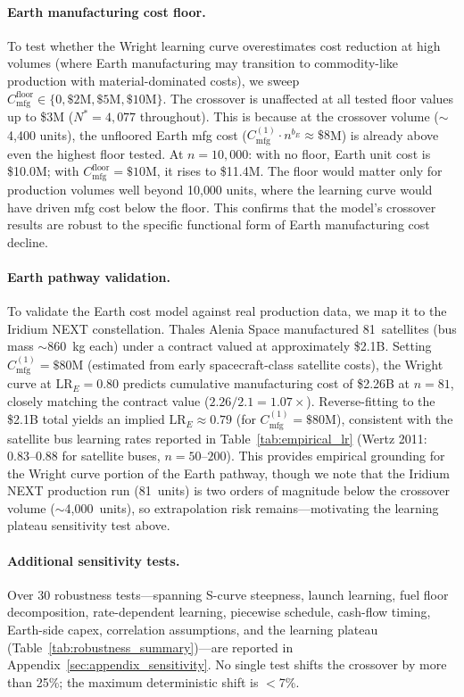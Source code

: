 \documentclass[preprint,12pt]{elsarticle}
\begin{document}
\paragraph{Earth manufacturing cost floor.} To test whether the Wright learning curve overestimates cost reduction at high volumes (where Earth manufacturing may transition to commodity-like production with material-dominated costs), we sweep $C_{\mathrm{mfg}}^{\mathrm{floor}} \in \{0, \$2\text{M}, \$5\text{M}, \$10\text{M}\}$. The crossover is unaffected at all tested floor values up to \$3M ($N^* = 4{,}077$ throughout). This is because at the crossover volume ($\sim$4{,}400 units), the unfloored Earth mfg cost ($C_{\mathrm{mfg}}^{(1)} \cdot n^{b_E} \approx \$8$M) is already above even the highest floor tested. At $n = 10{,}000$: with no floor, Earth unit cost is \$10.0M; with $C_{\mathrm{mfg}}^{\mathrm{floor}} = \$10$M, it rises to \$11.4M. The floor would matter only for production volumes well beyond 10{,}000 units, where the learning curve would have driven mfg cost below the floor. This confirms that the model's crossover results are robust to the specific functional form of Earth manufacturing cost decline.

\paragraph{Earth pathway validation.} To validate the Earth cost model against real production data, we map it to the Iridium NEXT constellation. Thales Alenia Space manufactured 81~satellites (bus mass $\sim$860~kg each) under a contract valued at approximately \$2.1B. Setting $C_{\mathrm{mfg}}^{(1)} = \$80$M (estimated from early spacecraft-class satellite costs), the Wright curve at $\mathrm{LR}_E = 0.80$ predicts cumulative manufacturing cost of \$2.26B at $n = 81$, closely matching the contract value ($2.26/2.1 = 1.07\times$). Reverse-fitting to the \$2.1B total yields an implied $\mathrm{LR}_E \approx 0.79$ (for $C_{\mathrm{mfg}}^{(1)} = \$80$M), consistent with the satellite bus learning rates reported in Table~\ref{tab:empirical_lr} (Wertz 2011: 0.83--0.88 for satellite buses, $n = 50$--$200$). This provides empirical grounding for the Wright curve portion of the Earth pathway, though we note that the Iridium NEXT production run (81~units) is two orders of magnitude below the crossover volume ($\sim$4{,}000~units), so extrapolation risk remains---motivating the learning plateau sensitivity test above.

\paragraph{Additional sensitivity tests.} Over 30 robustness tests---spanning S-curve steepness, launch learning, fuel floor decomposition, rate-dependent learning, piecewise schedule, cash-flow timing, Earth-side capex, correlation assumptions, and the learning plateau (Table~\ref{tab:robustness_summary})---are reported in Appendix~\ref{sec:appendix_sensitivity}. No single test shifts the crossover by more than 25\%; the maximum deterministic shift is $<$7\%.
\end{document}
